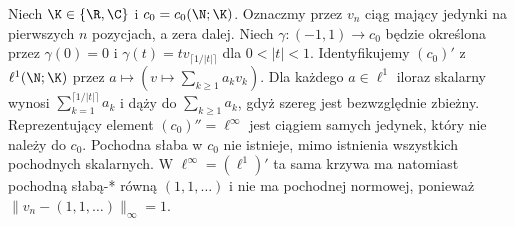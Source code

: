 \begin{przyklad}
\label{ex:scalar-not-weak-derivative14}
Niech $\K\in\{\R,\C\}$ i $c_0=c_0(\N;\K)$.
Oznaczmy przez $v_n$ ciąg mający jedynki na pierwszych
$n$ pozycjach, a zera dalej. Niech $\gamma:(-1,1)\to c_0$ będzie określona przez
$\gamma(0)=0$ i $\gamma(t)=t v_{\lceil1/|t|\rceil}$ dla $0<|t|<1$.
Identyfikujemy $(c_0)'$ z $\ell^1(\N;\K)$ przez
$a\mapsto(v\mapsto\sum_{k\ge1}a_kv_k)$. Dla każdego
$a\in\ell^1$ iloraz skalarny wynosi
$\sum_{k=1}^{\lceil1/|t|\rceil} a_k$ i dąży do
$\sum_{k\ge1}a_k$, gdyż szereg jest bezwzględnie zbieżny. Reprezentujący element $(c_0)''=\ell^\infty$
jest ciągiem samych jedynek, który nie należy do $c_0$.
Pochodna słaba w $c_0$ nie istnieje, mimo istnienia
wszystkich pochodnych skalarnych. W $\ell^\infty=(\ell^1)'$
ta sama krzywa ma natomiast pochodną słabą-* równą
$(1,1,\ldots)$ i nie ma pochodnej normowej, ponieważ
$\|v_n-(1,1,\ldots)\|_\infty=1$.
\end{przyklad}

